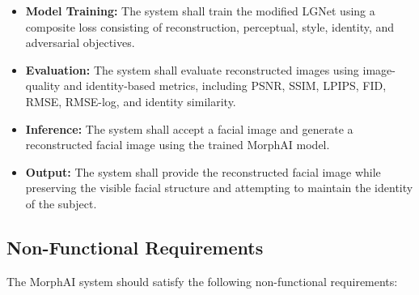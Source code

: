 \begin{itemize}
\item \textbf{Model Training:} The system shall train the modified LGNet using a composite loss consisting of reconstruction, perceptual, style, identity, and adversarial objectives.

\item \textbf{Evaluation:} The system shall evaluate reconstructed images using image-quality and identity-based metrics, including PSNR, SSIM, LPIPS, FID, RMSE, RMSE-log, and identity similarity.

\item \textbf{Inference:} The system shall accept a facial image and generate a reconstructed facial image using the trained MorphAI model.

\item \textbf{Output:} The system shall provide the reconstructed facial image while preserving the visible facial structure and attempting to maintain the identity of the subject.
\end{itemize}

\subsection{Non-Functional Requirements}

The MorphAI system should satisfy the following non-functional requirements:

